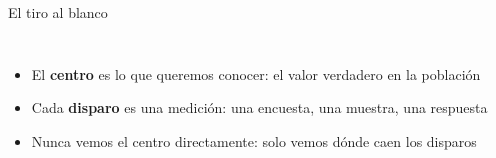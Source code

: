 \documentclass[aspectratio=169,11pt]{beamer}
\newcommand{\hl}[1]{\textcolor{marino}{\textbf{#1}}}        %
\newcommand{\diana}[3]{%
    \begin{scope}[shift={(#1,#2)}]
      \foreach \r/\c in {1.6/crema,1.1/marino!20,0.6/marino!40,0.2/marino} \fill[\c] (0,0) circle (\r);
      \draw[pizarra] (0,0) circle (1.6);
      \node[font=\scriptsize, align=center, text=pizarra] at (0,-2.2) {#3};
    \end{scope}}
\begin{document}
\begin{frame}{El tiro al blanco}
\begin{columns}[c]
\centering
{}
\begin{itemize}
  \item El \hl{centro} es lo que queremos conocer: el valor verdadero en la población
  \item Cada \textbf{disparo} es una medición: una encuesta, una muestra, una respuesta
  \item Nunca vemos el centro directamente: solo vemos dónde caen los disparos
\end{itemize}
\end{columns}
\end{frame}
\end{document}
